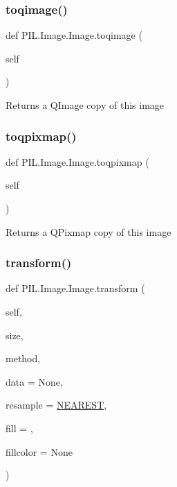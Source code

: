 \subsubsection{\texorpdfstring{toqimage()}{toqimage()}}
{\footnotesize\ttfamily def P\+I\+L.\+Image.\+Image.\+toqimage (\begin{DoxyParamCaption}\item[{}]{self }\end{DoxyParamCaption})}

\begin{DoxyVerb}Returns a QImage copy of this image\end{DoxyVerb}
 \mbox{\label{classPIL_1_1Image_1_1Image_a46366554e7dcf41798ecf43e7156edce}} 
\subsubsection{\texorpdfstring{toqpixmap()}{toqpixmap()}}
{\footnotesize\ttfamily def P\+I\+L.\+Image.\+Image.\+toqpixmap (\begin{DoxyParamCaption}\item[{}]{self }\end{DoxyParamCaption})}

\begin{DoxyVerb}Returns a QPixmap copy of this image\end{DoxyVerb}
 \mbox{\label{classPIL_1_1Image_1_1Image_ae0fd99f6ed6bd31d4ba201c136242a20}} 
\subsubsection{\texorpdfstring{transform()}{transform()}}
{\footnotesize\ttfamily def P\+I\+L.\+Image.\+Image.\+transform (\begin{DoxyParamCaption}\item[{}]{self,  }\item[{}]{size,  }\item[{}]{method,  }\item[{}]{data = {\ttfamily None},  }\item[{}]{resample = {\ttfamily \hyperlink{namespacePIL_1_1Image_afd842ab6c443c96339eb08e18ba4d206}{N\+E\+A\+R\+E\+ST}},  }\item[{}]{fill = {},  }\item[{}]{fillcolor = {\ttfamily None} }\end{DoxyParamCaption})}

